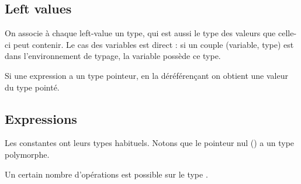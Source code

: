 \subsection{Left values}

On associe à chaque left-value un type, qui est aussi le type des valeurs que
celle-ci peut contenir. Le cas des variables est direct : si un couple
(variable, type) est dans l'environnement de typage, la variable possède ce
type.

\begin{mathpar}
\end{mathpar}

Si une expression a un type pointeur, en la déréférençant on obtient une valeur
du type pointé.

\begin{mathpar}
\end{mathpar}



\subsection{Expressions}

Les constantes ont leurs types habituels. Notons que le pointeur nul (\cNil) a
un type polymorphe.


Un certain nombre d'opérations est possible sur le type \tInt.

\begin{mathpar}
\end{mathpar}

